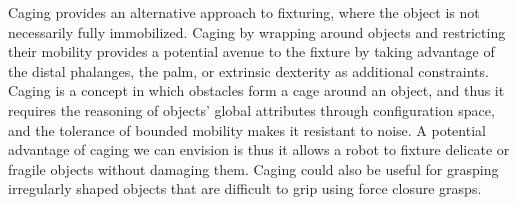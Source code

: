 \documentclass[conference]{IEEEtran}
\begin{document}
	Caging provides an alternative approach to fixturing, where the object is not necessarily fully immobilized. 
	Caging by wrapping around objects and restricting their mobility provides a potential avenue to the fixture by taking advantage of the distal phalanges, the palm, or extrinsic dexterity \cite{b21} as additional constraints.
	Caging is a concept in which obstacles form a cage around an object, 
	and thus it requires the reasoning of objects' global attributes through configuration space, and the tolerance of bounded mobility makes it resistant to noise.
	A potential advantage of caging we can envision is thus it allows a robot to fixture delicate or fragile objects without damaging them. 
	Caging could also be useful for grasping irregularly shaped objects that are difficult to grip using force closure grasps.
	
\end{document}
